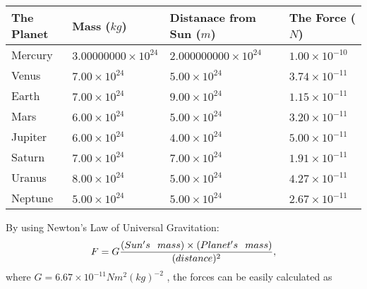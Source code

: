\documentclass[12pt]{article}
\begin{document}
\vspace{0.2in}
 
 
\begin{tabular}{|l|l|l|l|}
\hline
The Planet & Mass ($kg$) & Distanace from Sun ($m$) & The Force ($N$)\\
\hline
Mercury  &
           $ %
3.00000000 \times 10^{24} $   &
             $ %
2.000000000 \times 10^{24} $    & $ %
1.00 \times 10^{-10} $
\\  \hline
Venus    &
           $  %
7.00 \times 10^{24}  $     &
             $ %
5.00 \times 10^{24} $    & $ %
3.74 \times 10^{-11} $
\\  \hline
Earth    &
           $  %
7.00 \times 10^{24}  $     &
             $ %
9.00 \times 10^{24} $    & $ %
1.15 \times 10^{-11} $
\\   \hline
Mars     &
           $  %
6.00 \times 10^{24} $     &
             $ %
5.00 \times 10^{24} $    & $ %
3.20 \times 10^{-11} $
\\   \hline
Jupiter  &
           $  %
6.00 \times 10^{24} $    &
             $ %
4.00 \times 10^{24} $    & $ %
5.00 \times 10^{-11} $
\\  \hline
Saturn   &
           $  %
7.00 \times 10^{24} $    &
             $ %
7.00 \times 10^{24}  $    & $ %
1.91 \times 10^{-11} $
\\  \hline
Uranus   &
           $  %
8.00 \times 10^{24} $    &
             $ %
5.00 \times 10^{24} $    & $ %
4.27 \times 10^{-11} $
\\  \hline
Neptune  &
           $  %
5.00 \times 10^{24} $    &
             $ %
5.00 \times 10^{24} $    & $ %
2.67 \times 10^{-11} $
\\  \hline
 
\end{tabular}
 
 
 
 
\noindent{}
 
 

 
 
 
 
\noindent{}
 
 

By using Newton's Law of Universal Gravitation:
\[
F=G \frac{(Sun's \hspace{0.1in} mass) \times (Planet's \hspace{0.1in} mass)} { (distance)^2},
\]
where
$ G= %
6.67 \times 10^{-11} N m^{2}(kg)^{-2}$ , the forces can be easily calculated as
 
\end{document}

